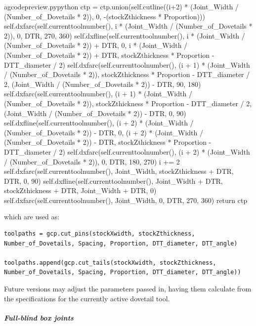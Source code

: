\documentclass{ltxdoc}
\begin{document}
\begin{writecode}{a}{gcodepreview.py}{python}
            ctp = ctp.union(self.cutline((i+2) * (Joint_Width / (Number_of_Dovetails * 2)), 0, -(stockZthickness * Proportion)))
            self.dxfarc(self.currenttoolnumber(), i * (Joint_Width / (Number_of_Dovetails * 2)), 0, DTR, 270, 360)
            self.dxfline(self.currenttoolnumber(), 
                i * (Joint_Width / (Number_of_Dovetails * 2)) + DTR, 
                0, 
                i * (Joint_Width / (Number_of_Dovetails * 2)) + DTR, stockZthickness * Proportion - DTT_diameter / 2)
            self.dxfarc(self.currenttoolnumber(), (i + 1) * (Joint_Width / (Number_of_Dovetails * 2)), stockZthickness * Proportion - DTT_diameter / 2, (Joint_Width / (Number_of_Dovetails * 2)) - DTR, 90, 180)
            self.dxfarc(self.currenttoolnumber(), (i + 1) * (Joint_Width / (Number_of_Dovetails * 2)), stockZthickness * Proportion - DTT_diameter / 2, (Joint_Width / (Number_of_Dovetails * 2)) - DTR, 0, 90)
            self.dxfline(self.currenttoolnumber(), 
                (i + 2) * (Joint_Width / (Number_of_Dovetails * 2)) - DTR, 
                0, 
                (i + 2) * (Joint_Width / (Number_of_Dovetails * 2)) - DTR, stockZthickness * Proportion - DTT_diameter / 2)
            self.dxfarc(self.currenttoolnumber(), (i + 2) * (Joint_Width / (Number_of_Dovetails * 2)), 0, DTR, 180, 270)
            i += 2
        self.dxfarc(self.currenttoolnumber(), Joint_Width, stockZthickness + DTR, DTR, 0, 90)
        self.dxfline(self.currenttoolnumber(), Joint_Width + DTR, stockZthickness + DTR, Joint_Width + DTR, 0)
        self.dxfarc(self.currenttoolnumber(), Joint_Width, 0, DTR, 270, 360)
        return ctp

\end{writecode}
\addtocounter{gcpy}{63}

\noindent which are used as:

\begin{verbatim}
toolpaths = gcp.cut_pins(stockXwidth, stockZthickness, Number_of_Dovetails, Spacing, Proportion, DTT_diameter, DTT_angle)

toolpaths.append(gcp.cut_tails(stockXwidth, stockZthickness, Number_of_Dovetails, Spacing, Proportion, DTT_diameter, DTT_angle))
\end{verbatim}

Future versions may adjust the parameters passed in, having them calculate from the specifications for the currently active dovetail tool.

\subparagraph{Full-blind box joints}
 
\label{subsec:fullblindboxjoints}
\end{document}
